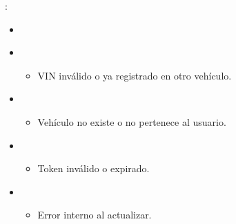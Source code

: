 \documentclass[a4paper,11pt,spanish]{sphinxmanual}
\begin{document}
\begin{fulllineitems}
\sphinxAtStartPar
{}:
\begin{itemize}
\item {} 
\sphinxAtStartPar
{}

\begin{sphinxVerbatim}[commandchars=\\\{\}]
\end{sphinxVerbatim}

\item {} 
\sphinxAtStartPar
{}
\begin{itemize}
\item {} 
\sphinxAtStartPar
VIN inválido o ya registrado en otro vehículo.

\end{itemize}

\begin{sphinxVerbatim}[commandchars=\\\{\}]
\end{sphinxVerbatim}

\item {} 
\sphinxAtStartPar
{}
\begin{itemize}
\item {} 
\sphinxAtStartPar
Vehículo no existe o no pertenece al usuario.

\end{itemize}

\begin{sphinxVerbatim}[commandchars=\\\{\}]
\end{sphinxVerbatim}

\item {} 
\sphinxAtStartPar
{}
\begin{itemize}
\item {} 
\sphinxAtStartPar
Token inválido o expirado.

\end{itemize}

\item {} 
\sphinxAtStartPar
{}
\begin{itemize}
\item {} 
\sphinxAtStartPar
Error interno al actualizar.

\end{itemize}

\end{itemize}

\end{fulllineitems}
\end{document}
